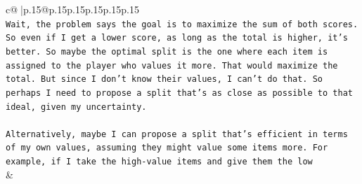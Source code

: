 \documentclass{article}
\begin{document}
{\begin{supertabular}{c@{$\;$}|p{.15\linewidth}@{}p{.15\linewidth}p{.15\linewidth}p{.15\linewidth}p{.15\linewidth}p{.15\linewidth}}
{{{\\ 
\texttt{Wait, the problem says the goal is to maximize the sum of both scores. So even if I get a lower score, as long as the total is higher, it's better. So maybe the optimal split is the one where each item is assigned to the player who values it more. That would maximize the total. But since I don't know their values, I can't do that. So perhaps I need to propose a split that's as close as possible to that ideal, given my uncertainty.} \\
\\ 
\texttt{Alternatively, maybe I can propose a split that's efficient in terms of my own values, assuming they might value some items more. For example, if I take the high{-}value items and give them the low} \\
            }
        }
    }
    & \\ \\


\end{supertabular}}
\end{document}
